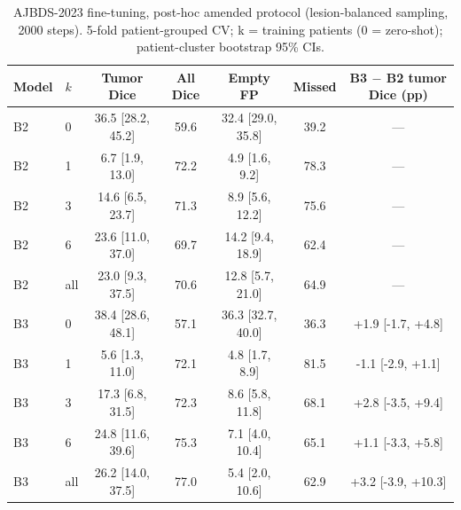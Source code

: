 \begin{table}[!ht]
\centering
\scriptsize
\caption{AJBDS-2023 fine-tuning, post-hoc amended protocol (lesion-balanced sampling, 2000 steps). 5-fold patient-grouped CV; k = training patients (0 = zero-shot); patient-cluster bootstrap 95\% CIs.}
\label{tab:s-ft-balanced}
\begin{tabular}{llccccc}
\toprule
Model & $k$ & Tumor Dice & All Dice & Empty FP & Missed & B3 $-$ B2 tumor Dice (pp) \\
\midrule
B2 & 0 & 36.5 [28.2, 45.2] & 59.6 & 32.4 [29.0, 35.8] & 39.2 & --- \\
B2 & 1 & 6.7 [1.9, 13.0] & 72.2 & 4.9 [1.6, 9.2] & 78.3 & --- \\
B2 & 3 & 14.6 [6.5, 23.7] & 71.3 & 8.9 [5.6, 12.2] & 75.6 & --- \\
B2 & 6 & 23.6 [11.0, 37.0] & 69.7 & 14.2 [9.4, 18.9] & 62.4 & --- \\
B2 & all & 23.0 [9.3, 37.5] & 70.6 & 12.8 [5.7, 21.0] & 64.9 & --- \\
B3 & 0 & 38.4 [28.6, 48.1] & 57.1 & 36.3 [32.7, 40.0] & 36.3 & +1.9 [-1.7, +4.8] \\
B3 & 1 & 5.6 [1.3, 11.0] & 72.1 & 4.8 [1.7, 8.9] & 81.5 & -1.1 [-2.9, +1.1] \\
B3 & 3 & 17.3 [6.8, 31.5] & 72.3 & 8.6 [5.8, 11.8] & 68.1 & +2.8 [-3.5, +9.4] \\
B3 & 6 & 24.8 [11.6, 39.6] & 75.3 & 7.1 [4.0, 10.4] & 65.1 & +1.1 [-3.3, +5.8] \\
B3 & all & 26.2 [14.0, 37.5] & 77.0 & 5.4 [2.0, 10.6] & 62.9 & +3.2 [-3.9, +10.3] \\
\bottomrule
\end{tabular}
\end{table}
